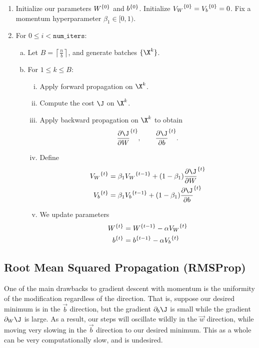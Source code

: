 \begin{enumerate}
	\item Initialize our parameters ${W}^{\{{0}\}}$ and ${b}^{\{{0}\}}$.  Initialize ${V_W}^{\{{0}\}}={V_b}^{\{{0}\}}=0$.  Fix a momentum hyperparameter $\beta_1\in[0,1)$.
	\item For $0\leq i<\texttt{num\_iters}$:
	\begin{enumerate}[a.]
		\item Let $B=\left\lceil\frac{n}{b}\right\rceil$, and generate batches $\{\X^k\}$.
		\item For $1\leq k\leq B$:
		\begin{enumerate}[i.]
			\item Apply forward propagation on $\X^k$.
			\item Compute the cost $\J$ on $\X^k$.
			\item Apply backward propagation on $\X^k$ to obtain
			$$\iter{\frac{\partial\J}{\partial W}}{t},\qquad \iter{\frac{\partial\J}{\partial b}}{t}.$$
			\item Define
			\begin{align*}
				\iter{V_W}{t}&=\beta_1\iter{V_W}{t-1}+(1-\beta_1)\iter{\frac{\partial\J}{\partial W}}{t}\\
				\iter{V_b}{t}&=\beta_1\iter{V_b}{t-1}+(1-\beta_1)\iter{\frac{\partial\J}{\partial b}}{t}
			\end{align*}
			\item We update parameters
			\begin{align*}
				{W}^{\{{t}\}}&={W}^{\{{t-1}\}}-\alpha {V_W}^{\{{t}\}}\\
				{b}^{\{{t}\}}&={b}^{\{{t-1}\}}-\alpha{V_b}^{\{{t}\}}
			\end{align*}
		\end{enumerate}
	\end{enumerate}
\end{enumerate}




\subsection{Root Mean Squared Propagation (RMSProp)}
One of the main drawbacks to gradient descent with momentum is the uniformity of the modification regardless of the direction.  That is, suppose our desired minimum is in the $\vec{b}$ direction, but the gradient $\partial_b\J$ is small while the gradient $\partial_W\J$ is large.  As a result, our steps will oscillate wildly in the $\vec{w}$ direction, while moving very slowing in the $\vec{b}$ direction to our desired minimum.  This as a whole can be very computationally slow, and is undesired.

